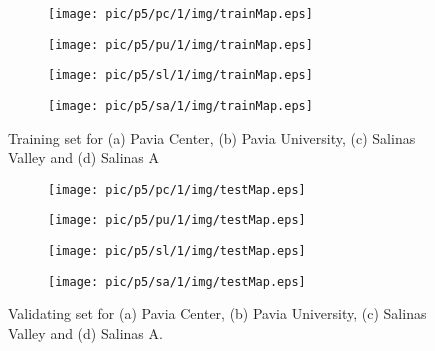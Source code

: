 \documentclass{article}
\begin{document}
	\begin{figure}[htbp]
		\begin{subfigure}{0.24\textwidth}
			\texttt{[image: pic/p5/pc/1/img/trainMap.eps]}
			\caption{}
		\end{subfigure}
		\begin{subfigure}{0.24\textwidth}
			\texttt{[image: pic/p5/pu/1/img/trainMap.eps]}
			\caption{}
		\end{subfigure}
		\begin{subfigure}{0.24\textwidth}
			\texttt{[image: pic/p5/sl/1/img/trainMap.eps]}
			\caption{}
		\end{subfigure}
		\begin{subfigure}{0.24\textwidth}
			\texttt{[image: pic/p5/sa/1/img/trainMap.eps]}
			\caption{}
		\end{subfigure}
		\caption{Training set for (a) Pavia Center, (b) Pavia University, (c) Salinas Valley and (d) Salinas A}
		\label{trainMaps}
	\end{figure}

	\begin{figure}[htbp]
		\begin{subfigure}{0.24\textwidth}
			\texttt{[image: pic/p5/pc/1/img/testMap.eps]}
			\caption{}
		\end{subfigure}
		\begin{subfigure}{0.24\textwidth}
			\texttt{[image: pic/p5/pu/1/img/testMap.eps]}
			\caption{}
		\end{subfigure}
		\begin{subfigure}{0.24\textwidth}
			\texttt{[image: pic/p5/sl/1/img/testMap.eps]}
			\caption{}
		\end{subfigure}
		\begin{subfigure}{0.24\textwidth}
			\texttt{[image: pic/p5/sa/1/img/testMap.eps]}
			\caption{}
		\end{subfigure}
		\caption{Validating set for (a) Pavia Center, (b) Pavia University, (c) Salinas Valley and (d) Salinas A.}
		\label{testMaps}
	\end{figure}
\end{document}
